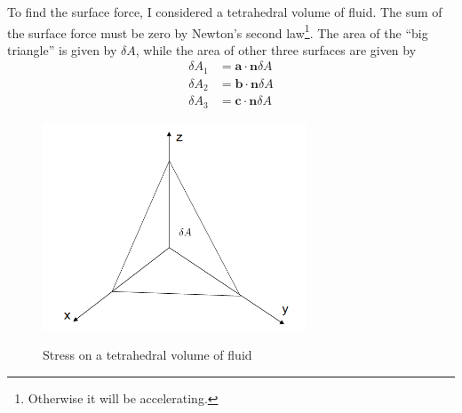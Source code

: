 To find the surface force, I considered a tetrahedral volume of
fluid. The sum of the surface force must be zero by Newton's second
law\footnote{Otherwise it will be accelerating.}. The area of the
``big triangle'' is given by $\delta A$, while the area of other
three surfaces are given by
\begin{subequations}
\begin{align}
    \delta A_1&=\mathbf{a}\cdot \mathbf{n} \delta A\\
    \delta A_2&=\mathbf{b}\cdot \mathbf{n} \delta A\\
    \delta A_3&=\mathbf{c}\cdot \mathbf{n} \delta A
\end{align}
\end{subequations}
\begin{figure}[htpb]
  \centering
  \includegraphics[width=0.7\textwidth]{stress.png}\\
  \caption{Stress on a tetrahedral volume of fluid}\label{stress}
\end{figure}

